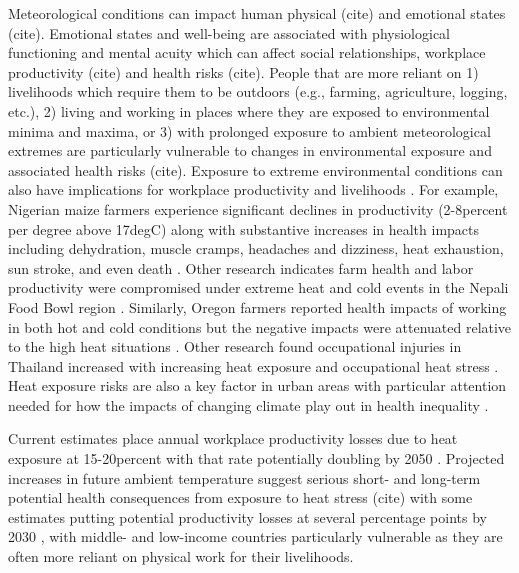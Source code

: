\documentclass{article}
\begin{document}
Meteorological conditions can impact human physical (cite) and emotional states (cite). Emotional states and well-being are associated with physiological functioning and mental acuity which can affect social relationships, workplace productivity (cite) and health risks (cite). People that are more reliant on 1) livelihoods which require them to be outdoors (e.g., farming, agriculture, logging, etc.), 2) living and working in places where they are exposed to environmental minima and maxima, or 3) with prolonged exposure to ambient meteorological extremes are particularly vulnerable to changes in environmental exposure \citep{frimpong_heat_2017} and associated health risks (cite). Exposure to extreme environmental conditions can also have implications for workplace productivity and livelihoods \cite{kjellstrom_impact_2016}. For example, Nigerian maize farmers experience significant declines in productivity (2-8percent per degree above 17degC) along with substantive increases in health impacts including dehydration, muscle cramps, headaches and dizziness, heat exhaustion, sun stroke, and even death \cite{sadiq_impact_2019}. Other research indicates farm health and labor productivity were compromised under extreme heat and cold events in the Nepali Food Bowl region \cite{budhathoki_socio-economic_2019}. Similarly, Oregon farmers reported health impacts of working in both hot and cold conditions but the negative impacts were attenuated relative to the high heat situations \cite{bethel_heat-related_2014}. Other research found occupational injuries in Thailand increased with increasing heat exposure and occupational heat stress \cite{tawatsupa_association_2013}. Heat exposure risks are also a key factor in urban areas with particular attention needed for how the impacts of changing climate play out in health inequality \cite{friel_urban_2011}. 

Current estimates place annual workplace productivity losses due to heat exposure at 15-20percent with that rate potentially doubling by 2050 \cite{kjellstrom_heat_2016}. Projected increases in future ambient temperature suggest serious short- and long-term potential health consequences from exposure to heat stress (cite) with some estimates putting potential productivity losses at several percentage points by 2030 \cite{kjellstrom_heat_2016}, with middle- and low-income countries particularly vulnerable as they are often more reliant on physical work for their livelihoods. 
\end{document}
